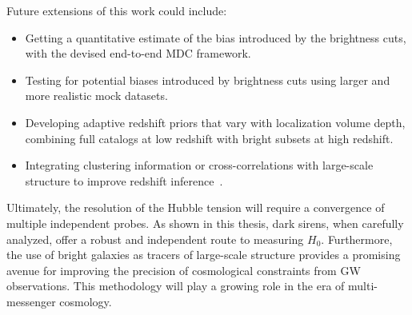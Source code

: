 Future extensions of this work could include:
\vspace{-1em}
\begin{itemize}
    \item Getting a quantitative estimate of the bias introduced by the brightness cuts, with the devised end-to-end \ac{MDC} framework.
    \vspace{-1em}
    \item Testing for potential biases introduced by brightness cuts using larger and more realistic mock datasets.
    \vspace{-1em}
    \item Developing adaptive redshift priors that vary with localization volume depth, combining full catalogs at low redshift with bright subsets at high redshift.
    \vspace{-1em}
    \item Integrating clustering information or cross-correlations with large-scale structure to improve redshift inference~\citep{afroz2024prospect}.
\end{itemize}

Ultimately, the resolution of the Hubble tension will require a convergence of multiple independent probes. As shown in this thesis, dark sirens, when carefully analyzed, offer a robust and independent route to measuring $H_0$. Furthermore, the use of bright galaxies as tracers of large-scale structure provides a promising avenue for improving the precision of cosmological constraints from \ac{GW} observations. This methodology will play a growing role in the era of multi-messenger cosmology.
